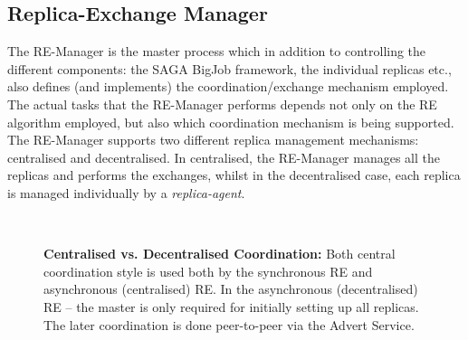 \documentclass{rspublic}
\newcommand{\jhanote}[1]{ {\textcolor{red} { ***shantenu: #1 }}}
\newcommand{\athotanote}[1]{ {\textcolor{green} { ***athota: #1 }}}
\newcommand{\athotanote}[1]{}
\newcommand{\jhanote}[1]{}
\begin{document}
\subsection{Replica-Exchange Manager}\label{repexmanager} 

  
  
The RE-Manager is the master process which in addition to controlling
the different components: the SAGA BigJob framework, the individual
replicas etc., also defines (and implements) the coordination/exchange
mechanism employed.  The actual tasks that the RE-Manager performs
depends not only on the RE algorithm employed, but also which
coordination mechanism is being supported.  The RE-Manager supports
two different replica management mechanisms: centralised and
decentralised. In centralised, the RE-Manager manages all the replicas
and performs the exchanges, whilst in the decentralised case, each
replica is managed individually by a {\it replica-agent}.



\begin{figure}%
\centering
{}\qquad
{}\\
\caption{\textbf{Centralised vs. Decentralised Coordination:} Both
  central coordination style is used both by the synchronous RE  and asynchronous (centralised) RE.  In the asynchronous (decentralised) RE --
  the master is only required for initially setting up all
  replicas. The later coordination is done peer-to-peer via the Advert
  Service.}
\label{fig:coordination}
\end{figure}
\end{document}
